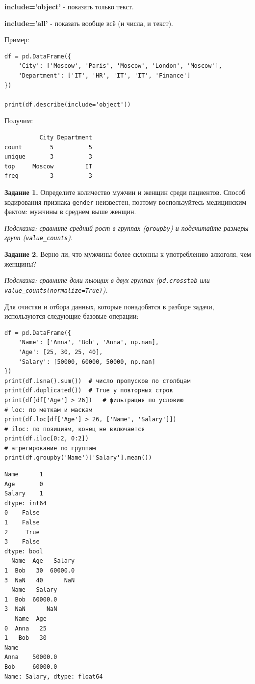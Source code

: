 \documentclass[pract]{SCWorks}
\begin{document}
\textbf{include='object'} - показать только текст.

\textbf{include='all'} - показать вообще всё (и числа, и текст).

Пример:

\begin{verbatim}
df = pd.DataFrame({
    'City': ['Moscow', 'Paris', 'Moscow', 'London', 'Moscow'],
    'Department': ['IT', 'HR', 'IT', 'IT', 'Finance']
})

print(df.describe(include='object'))
\end{verbatim}

Получим:

\begin{verbatim}
          City Department
count        5          5
unique       3          3
top     Moscow         IT
freq         3          3
\end{verbatim}

\medskip
\noindent\textbf{Задание 1.} Определите количество мужчин и женщин среди пациентов. Способ кодирования
признака \texttt{gender} неизвестен, поэтому воспользуйтесь медицинским фактом: мужчины в среднем выше женщин.

\textit{Подсказка: сравните средний рост в группах (\texttt{groupby}) и подсчитайте размеры групп
(\texttt{value\_counts}).}

\medskip
\noindent\textbf{Задание 2.} Верно ли, что мужчины более склонны к употреблению алкоголя, чем женщины?

\textit{Подсказка: сравните доли пьющих в двух группах (\texttt{pd.crosstab} или
\texttt{value\_counts(normalize=True)}).}

Для очистки и отбора данных, которые понадобятся в разборе задачи, используются следующие базовые операции:

\begin{verbatim}
df = pd.DataFrame({
    'Name': ['Anna', 'Bob', 'Anna', np.nan],
    'Age': [25, 30, 25, 40],
    'Salary': [50000, 60000, 50000, np.nan]
})
print(df.isna().sum())  # число пропусков по столбцам
print(df.duplicated())  # True у повторных строк
print(df[df['Age'] > 26])   # фильтрация по условию
# loc: по меткам и маскам
print(df.loc[df['Age'] > 26, ['Name', 'Salary']])
# iloc: по позициям, конец не включается
print(df.iloc[0:2, 0:2])
# агрегирование по группам
print(df.groupby('Name')['Salary'].mean())
\end{verbatim}

\begin{verbatim}
Name      1
Age       0
Salary    1
dtype: int64
0    False
1    False
2     True
3    False
dtype: bool
  Name  Age   Salary
1  Bob   30  60000.0
3  NaN   40      NaN
  Name   Salary
1  Bob  60000.0
3  NaN      NaN
   Name  Age
0  Anna   25
1   Bob   30
Name
Anna    50000.0
Bob     60000.0
Name: Salary, dtype: float64
\end{verbatim}
\end{document}

